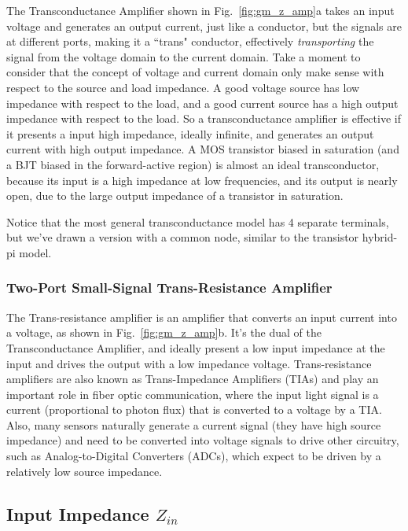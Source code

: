 The Transconductance Amplifier shown in Fig.~\ref{fig:gm_z_amp}a takes an input voltage and generates an output current, just like a conductor, but the signals are at different ports, making it a ``trans" conductor, effectively \emph{transporting} the signal from the voltage domain to the current domain.  Take a moment to consider that the concept of voltage and current domain only make sense with respect to the source and load impedance.  A good voltage source has low impedance with respect to the load, and a good current source has a high output impedance with respect to the load.  So a transconductance amplifier is effective if it presents a input high impedance, ideally infinite, and generates an output current with high output impedance.  A MOS transistor biased in saturation (and a BJT biased in the forward-active region) is almost an ideal transconductor, because its input is a high impedance at low frequencies, and its output is nearly open, due to the large output impedance of a transistor in saturation.  

Notice that the most general transconductance model has 4 separate terminals, but we've drawn a version with a common node, similar to the transistor hybrid-pi model. 


\subsubsection{Two-Port Small-Signal Trans-Resistance Amplifier}

The Trans-resistance amplifier is an amplifier that converts an input current into a voltage, as shown in Fig.~\ref{fig:gm_z_amp}b.  It's the dual of the Transconductance Amplifier, and ideally present a low input impedance at the input and drives the output with a low impedance voltage.  Trans-resistance amplifiers are also known as Trans-Impedance Amplifiers (TIAs) and play an important role in fiber optic communication, where the input light signal is a current (proportional to photon flux) that is converted to a voltage by a TIA.  Also, many sensors naturally generate a current signal (they have high source impedance) and need to be converted into voltage signals to drive other circuitry, such as Analog-to-Digital Converters (ADCs), which expect to be driven by a relatively low source impedance.  
 
 

\subsection{Input Impedance $Z_{in}$}

